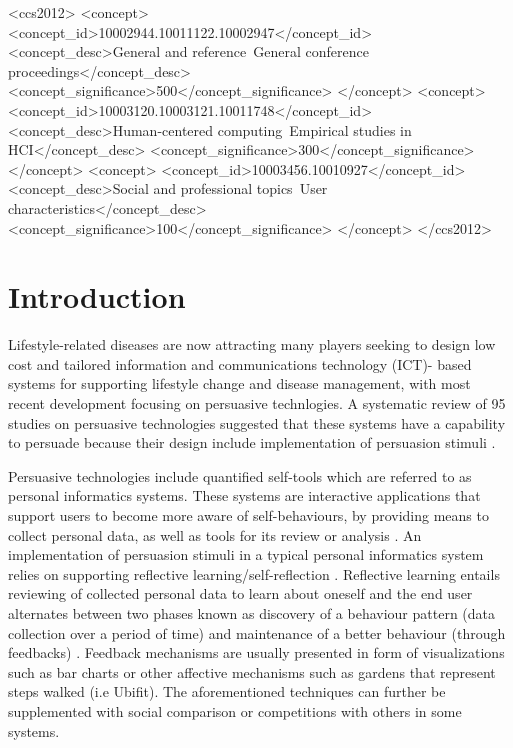\documentclass{sig-alternate}
\begin{document}
\begin{CCSXML}
<ccs2012>
<concept>
<concept_id>10002944.10011122.10002947</concept_id>
<concept_desc>General and reference~General conference proceedings</concept_desc>
<concept_significance>500</concept_significance>
</concept>
<concept>
<concept_id>10003120.10003121.10011748</concept_id>
<concept_desc>Human-centered computing~Empirical studies in HCI</concept_desc>
<concept_significance>300</concept_significance>
</concept>
<concept>
<concept_id>10003456.10010927</concept_id>
<concept_desc>Social and professional topics~User characteristics</concept_desc>
<concept_significance>100</concept_significance>
</concept>
</ccs2012>
\end{CCSXML}


%
%

%
%
\printccsdesc



\section{Introduction} 
Lifestyle-related diseases are now attracting many players seeking to design low cost and tailored information and communications technology (ICT)- based systems for supporting lifestyle change and disease management\cite{arsand:mobile}, with most recent development focusing on persuasive technlogies. A systematic review of 95 studies on persuasive technologies suggested that these systems have a capability to persuade because their design include implementation of persuasion stimuli \cite{hamari2014persuasive}.

Persuasive technologies include quantified self-tools which are referred to as personal informatics systems. These systems are interactive applications that support users to become more aware of self-behaviours, by providing means to collect personal data, as well as tools for its review or analysis \cite{li2011:personal,li2012:personal}. An implementation of persuasion stimuli in a typical personal informatics system relies on supporting reflective learning/self-reflection \cite{li2011:understanding}. Reflective learning entails reviewing of collected personal data to learn about oneself and the end user alternates between two phases known as discovery of a behaviour pattern (data collection over a period of time) and maintenance of a better behaviour (through feedbacks) \cite{li2011:understanding}. Feedback mechanisms are usually presented in form of visualizations such as bar charts or other affective mechanisms such as gardens that represent steps walked (i.e Ubifit\cite{klasnja2009:using}). The aforementioned techniques can further be supplemented with social comparison\cite{Oinas-kukkonen:psd} or competitions with others\cite{comber2013:designing} in some systems.
\end{document}
